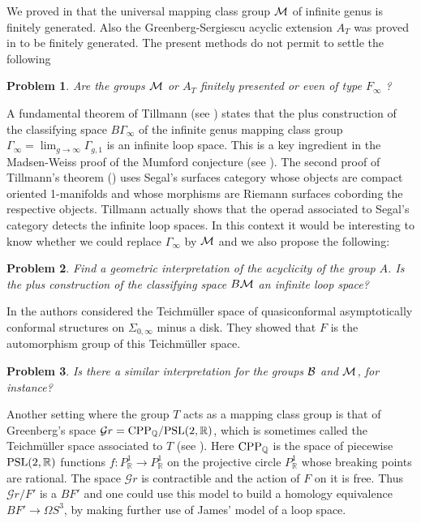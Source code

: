 \documentclass[twoside]{irmaems}
\theoremstyle{plain}
\newtheorem{problem}{Problem}
\theoremstyle{definition}
\theoremstyle{remark}
\newcommand{\Q}{{\mathbb{Q}}}
\newcommand{\R}{{\mathbb{R}}}
\newcommand{\M}{{{\cal M}}}
\newcommand{\B}{{{\cal B}}}
\begin{document}
\vspace{0.1cm}\noindent 
We proved in \cite{fu-ka3} that the universal mapping class group 
$\M$ of infinite genus is finitely generated. 
Also the Greenberg-Sergiescu acyclic extension ${A}_T$ was proved 
in \cite{fu-se} to be finitely generated. The present methods 
do not permit to settle the following

\begin{problem}
Are the groups $\M$ or $A_{T}$ finitely presented or even 
of type $F_{\infty}$ ? 
\end{problem}

\vspace{0.1cm}\noindent 
A fundamental theorem of Tillmann (see \cite{ti1,ti2}) states that 
the plus construction of the classifying space $B\Gamma_{\infty}$ 
of the infinite genus  mapping class group 
$\Gamma_{\infty}=\lim_{g\to \infty}\Gamma_{g,1}$ is an infinite loop space. 
This is a key ingredient in the Madsen-Weiss proof of the Mumford conjecture  
(see \cite{ma-we,mad}). The second proof of Tillmann's theorem (\cite{ti2}) 
uses Segal's  surfaces category whose objects are compact  
oriented 1-manifolds and whose morphisms are Riemann surfaces cobording 
the respective objects. Tillmann actually shows that the operad 
associated to Segal's category detects the infinite loop spaces. 
In this context it would be interesting to know whether we could replace 
$\Gamma_{\infty}$ by $\M$ and we also propose the following: 

\begin{problem}
Find a geometric interpretation of the acyclicity of the group $A$. 
Is the plus construction of the classifying space 
$B\M$ an infinite loop space? 
\end{problem}


\vspace{0.2cm}\noindent 
In \cite{dgh} the authors considered the Teichm\"uller space 
of  quasiconformal asymptotically conformal structures 
on $\Sigma_{0,\infty}$ minus a disk. They showed that $F$ is the automorphism group of this Teichm\"uller space. 

\begin{problem}
Is there a similar 
interpretation for the groups $\B$ and $\M$, for instance? 
\end{problem}


\vspace{0.2cm}\noindent 
Another setting where the group $T$ acts as a mapping class group is that 
of Greenberg's space ${\mathcal Gr}={\rm CPP}_{\Q}/{\rm PSL}(2,\R)$, which is 
sometimes called the Teichm\"uller space associated to $T$ (see \cite{gr,ma}). 
 Here ${\rm CPP}_{\Q}$ is the space of piecewise ${\rm PSL}(2,\R)$ 
functions $f:P_{\R}^1\to P_{\R}^1$ on the projective circle $P_{\R}^1$ 
whose breaking points are rational. 
The space ${\mathcal Gr}$ is contractible and the action of $F$ on 
it is free. Thus ${\mathcal Gr}/F'$ is a $BF'$ and one could use this model 
to build a homology equivalence $BF'\to \Omega S^3$, by making further use of 
James' model of a loop space. 
\end{document}
